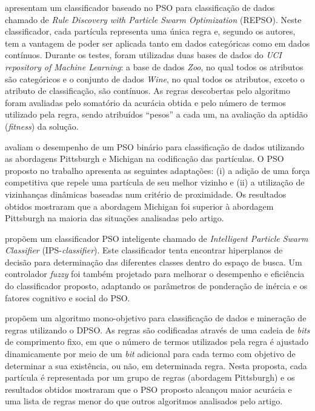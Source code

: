 \documentclass[
	12pt,				%
	openany,			%
	oneside,	
	a4paper,			%
	brazil,				%
	]{unimontes-ppgmsc-abntex2}
\begin{document}
 apresentam um classificador baseado no PSO para classificação de dados chamado de {\em Rule Discovery with Particle Swarm Optimization} (REPSO). Neste classificador, cada partícula representa uma única regra e, segundo os autores, tem a vantagem de poder ser aplicada tanto em dados categóricas como em dados contínuos. Durante os testes, foram utilizadas duas bases de dados do {\em UCI repository of Machine Learning}: a base de dados {\em Zoo}, no qual todos os atributos são categóricos e o conjunto de dados {\em Wine}, no qual todos os atributos, exceto o atributo de classificação, são contínuos. As regras descobertas pelo algoritmo foram avaliadas pelo somatório da acurácia obtida e pelo número de termos utilizado pela regra, sendo atribuídos ``pesos'' a cada um, na avaliação da aptidão ({\em fitness}) da solução.

 avaliam o desempenho de um PSO binário para classificação de dados utilizando as abordagens Pittsburgh e Michigan na codificação das partículas. O PSO proposto no trabalho apresenta as seguintes adaptações: (i) a adição de uma força competitiva que repele uma partícula de seu melhor vizinho e (ii) a utilização de vizinhanças dinâmicas baseadas num critério de proximidade. Os resultados obtidos mostraram que a abordagem Michigan foi superior à abordagem Pittsburgh na maioria das situações analisadas pelo artigo.

 propõem um classificador PSO inteligente chamado de {\em Intelligent Particle Swarm Classifier} (IPS-{\em classifier}). Este classificador tenta encontrar hiperplanos de decisão para determinação das diferentes classes dentro do espaço de busca. Um controlador {\em fuzzy} foi também projetado para melhorar o desempenho e eficiência do classificador proposto, adaptando os parâmetros de ponderação de inércia e os fatores cognitivo e social do PSO. 

 propõem um algoritmo mono-objetivo para classificação de dados e mineração de regras utilizando o DPSO. As regras são codificadas através de uma cadeia de {\em bits} de comprimento fixo, em que o número de termos utilizados pela regra é ajustado dinamicamente por meio de um {\em bit} adicional para cada termo com objetivo de determinar a sua existência, ou não, em determinada regra. Nesta proposta, cada partícula é representada por um grupo de regras (abordagem Pittsburgh) e os resultados obtidos mostraram que o PSO proposto alcançou maior acurácia e uma lista de regras menor do que outros algoritmos analisados pelo artigo.
\end{document}
